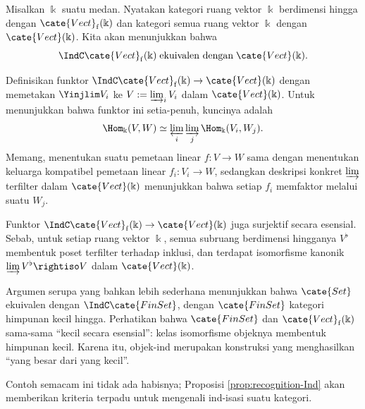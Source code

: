 \begin{example}\label{eg:Ind-Vect}
	Misalkan $\Bbbk$ suatu medan. Nyatakan kategori ruang vektor $\Bbbk$ berdimensi hingga dengan $\cate{Vect}_{\mathrm{f}}(\Bbbk)$ dan kategori semua ruang vektor $\Bbbk$ dengan $\cate{Vect}(\Bbbk)$. Kita akan menunjukkan bahwa
	\[ \IndC \cate{Vect}_{\mathrm{f}}(\Bbbk) \;\text{ekuivalen dengan}\; \cate{Vect}(\Bbbk). \]
	
	Definisikan funktor $\IndC\cate{Vect}_{\mathrm{f}}(\Bbbk)\to\cate{Vect}(\Bbbk)$ dengan memetakan $\Yinjlim V_i$ ke $V:=\varinjlim_i V_i$ dalam $\cate{Vect}(\Bbbk)$. Untuk menunjukkan bahwa funktor ini setia-penuh, kuncinya adalah
	\[ \Hom_{\Bbbk}(V, W) \simeq \varprojlim_i \varinjlim_j \Hom_{\Bbbk}(V_i, W_j). \]
	Memang, menentukan suatu pemetaan linear $f:V\to W$ sama dengan menentukan keluarga kompatibel pemetaan linear $f_i:V_i\to W$, sedangkan deskripsi konkret $\varinjlim$ terfilter dalam $\cate{Vect}(\Bbbk)$ menunjukkan bahwa setiap $f_i$ memfaktor melalui suatu $W_j$.
	
	Funktor $\IndC\cate{Vect}_{\mathrm{f}}(\Bbbk)\to\cate{Vect}(\Bbbk)$ juga surjektif secara esensial. Sebab, untuk setiap ruang vektor $\Bbbk$, semua subruang berdimensi hingganya $V^\flat$ membentuk poset terfilter terhadap inklusi, dan terdapat isomorfisme kanonik $\varinjlim V^\flat\rightiso V$ dalam $\cate{Vect}(\Bbbk)$.
\end{example}

Argumen serupa yang bahkan lebih sederhana menunjukkan bahwa $\cate{Set}$ ekuivalen dengan $\IndC\cate{FinSet}$, dengan $\cate{FinSet}$ kategori himpunan kecil hingga. Perhatikan bahwa $\cate{FinSet}$ dan $\cate{Vect}_{\mathrm{f}}(\Bbbk)$ sama-sama ``kecil secara esensial'': kelas isomorfisme objeknya membentuk himpunan kecil. Karena itu, objek-ind merupakan konstruksi yang menghasilkan ``yang besar dari yang kecil''.

Contoh semacam ini tidak ada habisnya; Proposisi \ref{prop:recognition-Ind} akan memberikan kriteria terpadu untuk mengenali ind-isasi suatu kategori.


